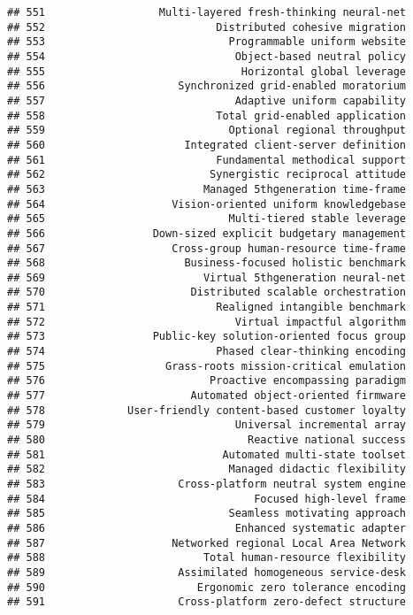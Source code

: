 \documentclass[
]{article}
\begin{document}
\begin{verbatim}
## 551                  Multi-layered fresh-thinking neural-net
## 552                           Distributed cohesive migration
## 553                             Programmable uniform website
## 554                              Object-based neutral policy
## 555                               Horizontal global leverage
## 556                     Synchronized grid-enabled moratorium
## 557                              Adaptive uniform capability
## 558                           Total grid-enabled application
## 559                             Optional regional throughput
## 560                      Integrated client-server definition
## 561                           Fundamental methodical support
## 562                          Synergistic reciprocal attitude
## 563                         Managed 5thgeneration time-frame
## 564                    Vision-oriented uniform knowledgebase
## 565                             Multi-tiered stable leverage
## 566                 Down-sized explicit budgetary management
## 567                    Cross-group human-resource time-frame
## 568                      Business-focused holistic benchmark
## 569                         Virtual 5thgeneration neural-net
## 570                       Distributed scalable orchestration
## 571                           Realigned intangible benchmark
## 572                              Virtual impactful algorithm
## 573                 Public-key solution-oriented focus group
## 574                           Phased clear-thinking encoding
## 575                   Grass-roots mission-critical emulation
## 576                          Proactive encompassing paradigm
## 577                       Automated object-oriented firmware
## 578             User-friendly content-based customer loyalty
## 579                              Universal incremental array
## 580                                Reactive national success
## 581                            Automated multi-state toolset
## 582                             Managed didactic flexibility
## 583                     Cross-platform neutral system engine
## 584                                 Focused high-level frame
## 585                             Seamless motivating approach
## 586                              Enhanced systematic adapter
## 587                    Networked regional Local Area Network
## 588                         Total human-resource flexibility
## 589                     Assimilated homogeneous service-desk
## 590                        Ergonomic zero tolerance encoding
## 591                     Cross-platform zero-defect structure

\end{verbatim}
\end{document}
